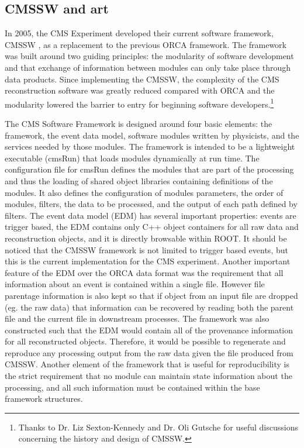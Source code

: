 \subsection{CMSSW and art}

In 2005, the CMS Experiment developed their current software framework, CMSSW \cite{cmssw}, as a replacement to the previous ORCA framework. The framework was built around two guiding principles: the modularity of software development and that exchange of information between modules can only take place through data products. Since implementing the CMSSW, the complexity of the CMS reconstruction software was greatly reduced compared with ORCA and the modularity lowered the barrier to entry for beginning software developers.\footnote{Thanks to Dr. Liz Sexton-Kennedy and Dr. Oli Gutsche for useful discussions concerning the history and design of CMSSW.}

The CMS Software Framework is designed around four basic elements: the framework, the event data model, software modules written by physicists, and the services needed by those modules\cite{cmssw_web}. The framework is intended to be a lightweight executable (cmsRun) that loads modules dynamically at run time. The configuration file for cmsRun defines the modules that are part of the processing and thus the loading of shared object libraries containing definitions of the modules. It also defines the configuration of modules parameters, the order of modules, filters, the data to be processed, and the output of each path defined by filters. The event data model (EDM) has several important properties: events are trigger based, the EDM contains only C++ object containers for all raw data and reconstruction objects, and it is directly browsable within ROOT. It should be noticed that the CMSSW framework is not limited to trigger based events, but this is the current implementation for the CMS experiment. Another important feature of the EDM over the ORCA data format was the requirement that all information about an event is contained within a single file. However file parentage information is also kept so that if object from an input file are dropped (eg. the raw data) that information can be recovered by reading both the parent file and the current file in downstream processes. The framework was also constructed such that the EDM would contain all of the provenance information for all reconstructed objects. Therefore, it would be possible to regenerate and reproduce any processing output from the raw data given the file produced from CMSSW. Another element of the framework that is useful for reproducibility is the strict requirement that no module can maintain state information about the processing, and all such information must be contained within the base framework structures.

